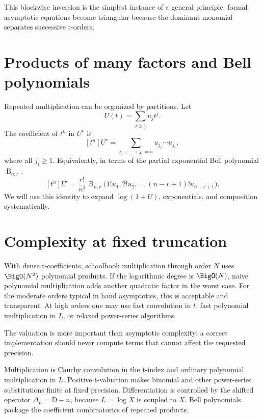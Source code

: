 \documentclass[11pt,openany]{book}
\theoremstyle{definition}
\theoremstyle{plain}
\theoremstyle{remark}
\newcommand{\Bell}{\operatorname{B}}
\newcommand{\Dop}{\mathrm{D}}
\begin{document}
This blockwise inversion is the simplest instance of a general principle:
formal asymptotic equations become triangular because the dominant monomial
separates successive t-orders.

\section{Products of many factors and Bell polynomials}
Repeated multiplication can be organized by partitions.  Let
\[
 U(t)=\sum_{j\ge1}u_jt^j.
\]
The coefficient of \(t^n\) in \(U^r\) is
\begin{equation}\label{eq:ordinary-compositions-coeff}
 [t^n]U^r
 =\sum_{j_1+\cdots+j_r=n}u_{j_1}\cdots u_{j_r},
\end{equation}
where all \(j_i\ge1\).  Equivalently, in terms of the partial exponential Bell
polynomial \(\Bell_{n,r}\),
\begin{equation}\label{eq:bell-coeff}
 [t^n]U^r
 =\frac{r!}{n!}\,
 \Bell_{n,r}\bigl(1!u_1,2!u_2,\ldots,(n-r+1)!u_{n-r+1}\bigr).
\end{equation}
We will use this identity to expand \(\log(1+U)\), exponentials, and composition
systematically.

\section{Complexity at fixed truncation}
With dense t-coefficients, schoolbook multiplication through order \(N\) uses
\(\BigO(N^2)\) polynomial products.  If the logarithmic degree is \(\BigO(N)\), naive
polynomial multiplication adds another quadratic factor in the worst case.
For the moderate orders typical in hand asymptotics, this is acceptable and
transparent.  At high orders one may use fast convolution in \(t\), fast
polynomial multiplication in \(L\), or relaxed power-series algorithms.

The valuation is more important than asymptotic complexity: a correct
implementation should never compute terms that cannot affect the requested
precision.

\begin{summarybox}
Multiplication is Cauchy convolution in the t-index and ordinary polynomial
multiplication in \(L\).  Positive t-valuation makes binomial and other
power-series substitutions finite at fixed precision.  Differentiation is
controlled by the shifted operator \(\Delta_n=\Dop-n\), because
\(L=\log X\) is coupled to \(X\).  Bell polynomials package the coefficient
combinatorics of repeated products.
\end{summarybox}
\end{document}
